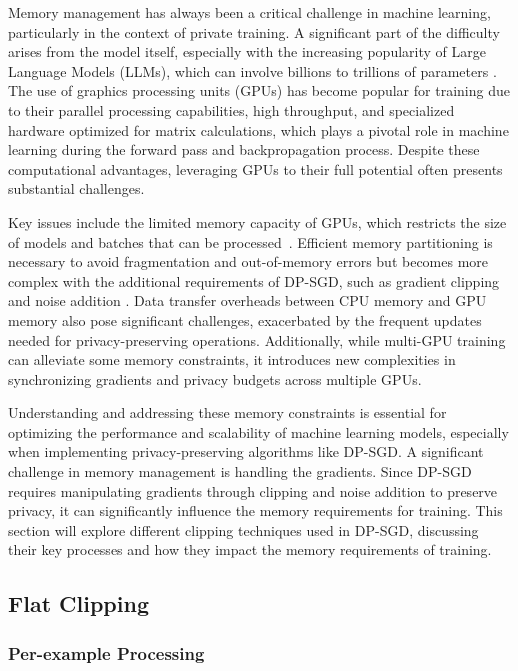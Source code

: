 Memory management has always been a critical challenge in machine learning, particularly in the context of private training. A significant part of the difficulty arises from the model itself, especially with the increasing popularity of Large Language Models (LLMs), which can involve billions to trillions of parameters \cite{RefWorks:RefID:54-rajbhandari2020zero:}. The use of graphics processing units (GPUs) has become popular for training due to their parallel processing capabilities, high throughput, and specialized hardware optimized for matrix calculations, which plays a pivotal role in machine learning during the forward pass and backpropagation process. Despite these computational advantages, leveraging GPUs to their full potential often presents substantial challenges.

Key issues include the limited memory capacity of GPUs, which restricts the size of models and batches that can be processed~\cite{RefWorks:RefID:59-pleissmemory-efficient}. Efficient memory partitioning is necessary to avoid fragmentation and out-of-memory errors but becomes more complex with the additional requirements of DP-SGD, such as gradient clipping and noise addition \cite{RefWorks:RefID:40-abadi2016deep}. Data transfer overheads between CPU memory and GPU memory also pose significant challenges, exacerbated by the frequent updates needed for privacy-preserving operations. Additionally, while multi-GPU training can alleviate some memory constraints, it introduces new complexities in synchronizing gradients and privacy budgets across multiple GPUs.

Understanding and addressing these memory constraints is essential for optimizing the performance and scalability of machine learning models, especially when implementing privacy-preserving algorithms like DP-SGD. A significant challenge in memory management is handling the gradients. Since DP-SGD requires manipulating gradients through clipping and noise addition to preserve privacy, it can significantly influence the memory requirements for training. This section will explore different clipping techniques used in DP-SGD, discussing their key processes and how they impact the memory requirements of training.
\subsection{Flat Clipping}

\subsubsection{Per-example Processing}

